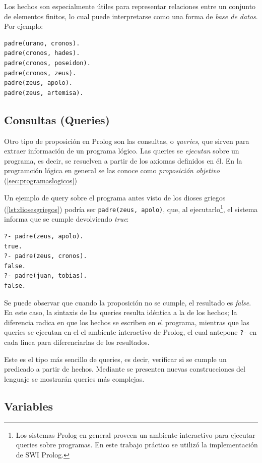 \documentclass[12pt,titlepage]{article}
\begin{document}
Los hechos son especialmente útiles para representar relaciones entre un conjunto de elementos finitos, lo cual puede interpretarse como una forma de \emph{base de datos}. Por ejemplo:
\begin{lstlisting}[label=lst:diosesgriegos]
padre(urano, cronos).
padre(cronos, hades).
padre(cronos, poseidon).
padre(cronos, zeus).
padre(zeus, apolo).
padre(zeus, artemisa).
\end{lstlisting}

\subsection{Consultas (Queries)}

Otro tipo de proposición en Prolog son las consultas, o \emph{queries}, que sirven para extraer información de un programa lógico. Las queries se \emph{ejecutan} sobre un programa, es decir, se resuelven a partir de los axiomas definidos en él. En la programción lógica en general se las conoce como \emph{proposición objetivo} (\ref{sec:programaslogicos})

Un ejemplo de query sobre el programa antes visto de los dioses griegos (\ref{lst:diosesgriegos}) podría ser \lstinline|padre(zeus, apolo)|, que, al ejecutarlo\footnote{Los sistemas Prolog en general proveen un ambiente interactivo para ejecutar queries sobre programas. En este trabajo práctico se utilizó la implementación de SWI Prolog.}, el sistema informa que se cumple devolviendo \emph{true}:
\begin{lstlisting}
?- padre(zeus, apolo).
true.
?- padre(zeus, cronos).
false.
?- padre(juan, tobias).
false.
\end{lstlisting}

Se puede observar que cuando la proposición no se cumple, el resultado es \emph{false}. En este caso, la sintaxis de las queries resulta idéntica a la de los hechos; la diferencia radica en que los hechos se escriben en el programa, mientras que las queries se ejecutan en el el ambiente interactivo de Prolog, el cual antepone \lstinline|?-| en cada linea para diferenciarlas de los resultados.

Este es el tipo más sencillo de queries, es decir, verificar si se cumple un predicado a partir de hechos. Mediante se presenten nuevas construcciones del lenguaje se mostrarán queries más complejas.

\subsection{Variables}
\end{document}
